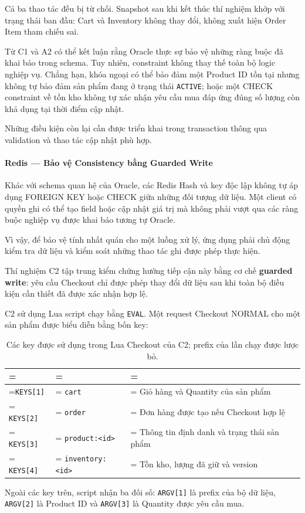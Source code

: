 Cả ba thao tác đều bị từ chối. Snapshot sau khi kết thúc thí nghiệm khớp với trạng thái ban đầu: Cart và Inventory không thay đổi, không xuất hiện Order Item tham chiếu sai.

Từ C1 và A2 có thể kết luận rằng Oracle thực sự bảo vệ những ràng buộc đã khai báo trong schema. Tuy nhiên, constraint không thay thế toàn bộ logic nghiệp vụ. Chẳng hạn, khóa ngoại có thể bảo đảm một Product ID tồn tại nhưng không tự bảo đảm sản phẩm đang ở trạng thái \texttt{ACTIVE}; hoặc một CHECK constraint về tồn kho không tự xác nhận yêu cầu mua đáp ứng đúng số lượng còn khả dụng tại thời điểm cập nhật.

Những điều kiện còn lại cần được triển khai trong transaction thông qua validation và thao tác cập nhật phù hợp.

\paragraph*{Redis — Bảo vệ Consistency bằng Guarded Write}

Khác với schema quan hệ của Oracle, các Redis Hash và key độc lập không tự áp dụng FOREIGN KEY hoặc CHECK giữa những đối tượng dữ liệu. Một client có quyền ghi có thể tạo field hoặc cập nhật giá trị mà không phải vượt qua các ràng buộc nghiệp vụ được khai báo tương tự Oracle.

Vì vậy, để bảo vệ tính nhất quán cho một luồng xử lý, ứng dụng phải chủ động kiểm tra dữ liệu và kiểm soát những thao tác ghi được phép thực hiện.

Thí nghiệm C2 tập trung kiểm chứng hướng tiếp cận này bằng cơ chế \textbf{guarded write}: yêu cầu Checkout chỉ được phép thay đổi dữ liệu sau khi toàn bộ điều kiện cần thiết đã được xác nhận hợp lệ.

C2 sử dụng Lua script chạy bằng \texttt{EVAL}. Một request Checkout NORMAL cho một sản phẩm được biểu diễn bằng bốn key:

\begin{table}[!htbp]
\centering
\caption{Các key được sử dụng trong Lua Checkout của C2; prefix của lần chạy được lược bỏ.}\label{tab:tx-10}
\reporttablesetup
\begin{tabularx}{\linewidth}{|>{\hsize\linewidth=\hsize}L|>{\hsize\linewidth=\hsize}L|>{\hsize\linewidth=\hsize}L|}
\hline
{}
 &  &  \\ \hline
\texttt{KEYS[1]} & \texttt{cart} & Giỏ hàng và Quantity của sản phẩm \\ \hline
\texttt{KEYS[2]} & \texttt{order} & Đơn hàng được tạo nếu Checkout hợp lệ \\ \hline
\texttt{KEYS[3]} & \texttt{product:\allowbreak{}<id>} & Thông tin định danh và trạng thái sản phẩm \\ \hline
\texttt{KEYS[4]} & \texttt{inventory:\allowbreak{}<id>} & Tồn kho, lượng đã giữ và version \\ \hline
\end{tabularx}
\end{table}
Ngoài các key trên, script nhận ba đối số: \texttt{ARGV[1]} là prefix của bộ dữ liệu, \texttt{ARGV[2]} là Product ID và \texttt{ARGV[3]} là Quantity được yêu cầu mua.


